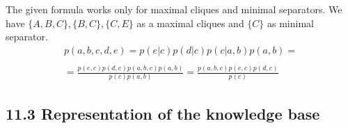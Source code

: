 \documentclass[11pt,a4paper]{article}
\begin{document}
The given formula works only for maximal cliques and minimal separators. We have $\{A, B, C\}, \{B, C\}, \{C, E\}$ as a maximal cliques and $\{C\}$ as minimal separator.
\begin{equation}
  \begin{split}
    p(a, b, c, d, e) = p(e|c)p(d|c)p(c|a,b)p(a,b) = \\
    \\
    = \frac{p(e, c)p(d, e)p(a, b, c)p(a, b)}{p(c)p(a, b)} = \frac{p(a, b, c)p(e, c)p(d, c)}{p(c)}
    \end{split}
\end{equation}
\subsection*{11.3 Representation of the knowledge base}
\end{document}
